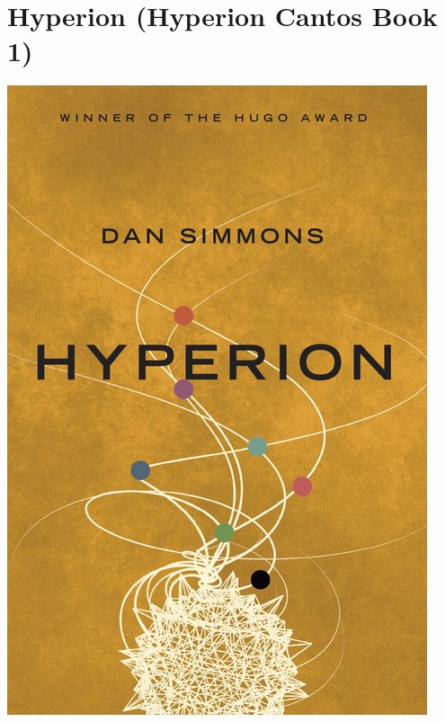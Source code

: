 \documentclass{tufte-handout}
\makeatletter
\newcommand{\varcaption}[2][0pt]{%
  \gsetlength{\@tufte@caption@vertical@offset}{-#1}%
  \gdef\@tufte@stored@varcaption{#2}%
}
\gdef\@tufte@stored@varcaption{} %
\makeatother
\begin{document}
\section*{Hyperion (Hyperion Cantos Book 1)}
\begin{marginfigure}[11\baselineskip]
   \includegraphics[width=\linewidth]{images/hyperion.jpg}
   \varcaption{\href{https://www.penguinrandomhouse.com/books/167468/hyperion-by-dan-simmons/}{Publisher Link}, \href{https://www.amazon.com/Silmarillion-J-R-R-Tolkien/dp/0544338014}{Amazon Link}}
\end{marginfigure}
\end{document}
